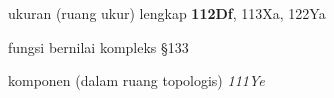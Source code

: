 

































ukuran (ruang ukur) lengkap {\bf 112Df}, 113Xa, 122Ya






























































fungsi bernilai kompleks \S133

komponen 
  (dalam ruang topologis) {\it 111Ye}







































